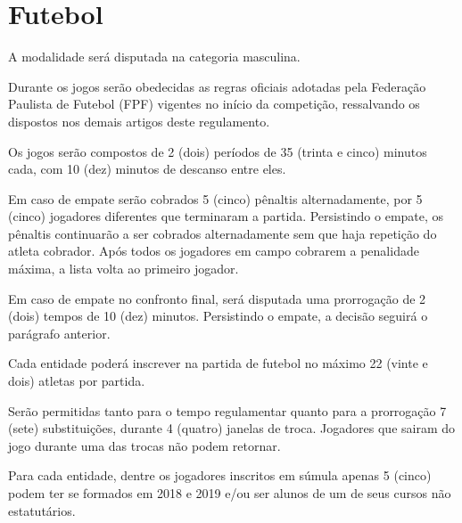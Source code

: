 {\let\clearpage\relax \chapter{Futebol}}

\begin{article}
	A modalidade será disputada na categoria masculina.
\end{article}

\begin{article}
	Durante os jogos serão obedecidas as regras oficiais adotadas pela Federação Paulista de Futebol (FPF) vigentes no início da competição, ressalvando os dispostos nos demais artigos deste regulamento.
\end{article}

\begin{article}
	Os jogos serão compostos de 2 (dois) períodos de 35 (trinta e cinco) minutos cada, com 10 (dez) minutos de descanso entre eles.

	\begin{xparagraph}
		Em caso de empate serão cobrados 5 (cinco) pênaltis alternadamente, por 5 (cinco) jogadores diferentes que terminaram a partida. Persistindo o empate, os pênaltis continuarão a ser cobrados alternadamente sem que haja repetição do atleta cobrador. Após todos os jogadores em campo cobrarem a penalidade máxima, a lista volta ao primeiro jogador.
	\end{xparagraph}

	\begin{xparagraph}
		Em caso de empate no confronto final, será disputada uma prorrogação de 2 (dois) tempos de 10 (dez) minutos. Persistindo o empate, a decisão seguirá o parágrafo anterior.
	\end{xparagraph}
\end{article}

\begin{article}
	Cada entidade poderá inscrever na partida de futebol no máximo 22 (vinte e dois) atletas por partida.
\end{article}

\begin{article}
	Serão permitidas tanto para o tempo regulamentar quanto para a prorrogação 7 (sete) substituições, durante 4 (quatro) janelas de troca. Jogadores que sairam do jogo durante uma das trocas não podem retornar.
\end{article}

\begin{article}
	Para cada entidade, dentre os jogadores inscritos em súmula apenas 5 (cinco) podem ter se formados em 2018 e 2019 e/ou ser alunos de um de seus cursos não estatutários.
\end{article}
